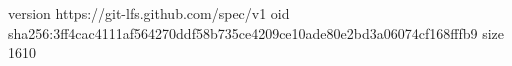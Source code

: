 version https://git-lfs.github.com/spec/v1
oid sha256:3ff4cac4111af564270ddf58b735ce4209ce10ade80e2bd3a06074cf168fffb9
size 1610
